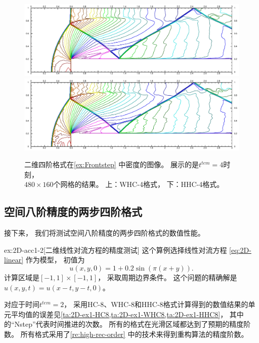 \begin{figure}[htbp]
  \centering
  \includegraphics[width=\textwidth]{fig/2D/Frontstep_S2O4-WHC4_CFL0.600000.pdf}
  \includegraphics[width=\textwidth]{fig/2D/Frontstep_S2O4-HHC4theta20_CFL0.600000.pdf}
  \caption{二维四阶格式在\cref{ex:Frontstep} 中密度的图像。
    展示的是$t^{tem}=4$时刻，
    \\$480 \times 160$个网格的结果。
    上：WHC-4格式，
    下：HHC-4格式。
  }
  \label{fig:Frontstep}
\end{figure}

\subsection{空间八阶精度的两步四阶格式}

接下来，
我们将测试空间八阶精度的两步四阶格式的数值性能。

\begin{exampleRe}{ex:2D-acc1}{-2}[二维线性对流方程的精度测试]
  \label{ex:2D-acc1-re}
  这个算例选择线性对流方程 \cref{eq:2D-linear} 作为模型，
  初值为
  \begin{equation}
    u(x,y,0) = 1 + 0.2\sin(\pi (x+y)).
  \end{equation}
  计算区域是$[-1,1]\times[-1,1]$，
  采取周期边界条件。
  这个问题的精确解是$u(x,y,t) = u(x-t,y-t,0)$。
\end{exampleRe}

对应于时间$t^{tem}=2$，
采用HC-8、WHC-8和HHC-8格式计算得到的数值结果的单元平均值的误差见\cref{ta:2D-ex1-HC8,ta:2D-ex1-WHC8,ta:2D-ex1-HHC8}，
其中的“Nstep”代表时间推进的次数。
所有的格式在光滑区域都达到了预期的精度阶数。
所有格式采用了\cref{re:high-rec-order} 中的技术来得到重构算法的精度阶数。

